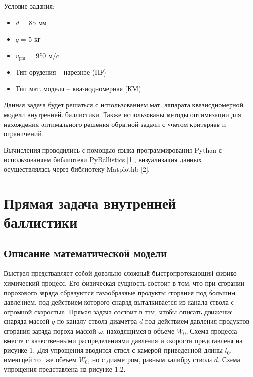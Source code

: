 \documentclass[14pt, a4paper]{report} %
\begin{document}
Условие задания: 
\begin{itemize}
    \item $d$ = 85 мм
    \item $q$ = 5 кг
    \item $v_{\text{pm}}$ = 950 $\text{м/c}$
    \item Тип орудения -- нарезное (НР)
    \item Тип мат. модели -- квазиодномерная (КМ)
\end{itemize}

Данная задача будет решаться с использованием мат. аппарата квазиодномерной модели внутренней.
баллистики. Также использованы методы оптимизации для нахождения оптимального решения обратной задачи с учетом критериев и ограничений.

Вычисления проводились с помощью языка программирования Python с использованием библиотеки PyBallistics [1], визуализация данных осуществлялась 
через библиотеку Matplotlib [2].

\newpage
\chapter{Прямая задача внутренней баллистики}
\section{Описание математической модели}

Выстрел предствавляет собой довольно сложный быстропротекающий физико-химический процесс. Его физическая сущность состоит в том, что при сгорании порохового заряда образуются газообразные продукты сгорания под большим давлением, 
под действием которого снаряд выталкивается из канала ствола с огромной скоростью. Прямая задача состоит в том, чтобы описать движение снаряда массой $q$ по каналу ствола диаметра $d$ под действием давления продуктов сгорания заряда пороха массой $\omega$, находящимся в объеме $W_0$. Схема процесса вместе с качественными распределениями давления и скорости представлена на рисунке 1.
Для упрощения вводится ствол с камерой приведенной длины $l_0$, имеющей тот же обеъем $W_0$, но с диаметром, равным калибру ствола $d$. Схема упрощения представлена на рисунке 1.2. 
\end{document}
